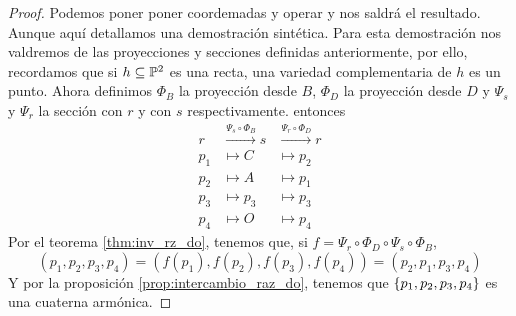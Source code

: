 \begin{thm}
\begin{center}
    \end{center}
\end{thm}

\begin{proof}
 Podemos poner poner coordemadas y operar y nos saldrá el resultado. Aunque aquí detallamos una demostración
 sintética. Para esta demostración nos valdremos de las proyecciones y secciones definidas anteriormente, por
 ello, recordamos que si $h \subseteq \mathbb{P}^2$ es una recta, una variedad complementaria de $h$ es un punto. Ahora
 definimos $\Phi_B$ la proyección desde $B$, $\Phi_D$ la proyección desde $D$ y $\Psi_s$ y $\Psi_r$ la sección
 con $r$ y con $s$ respectivamente. entonces
 \[
  \begin{array}{ccc}
   r & \stackrel{\Psi_s \circ \Phi_B}{\to} s & \stackrel{\Psi_r \circ \Phi_D}{\to} r \\
   p_1 &\mapsto C &\mapsto p_2 \\
   p_2 &\mapsto A &\mapsto p_1 \\
   p_3 &\mapsto p_3 &\mapsto p_3 \\
   p_4 &\mapsto O &\mapsto p_4
  \end{array}
 \]
 Por el teorema \ref{thm:inv_rz_do}, tenemos que, si $f = \Psi_r \circ \Phi_D \circ \Psi_s \circ \Phi_B$,
 \[
  (p_1,p_2,p_3,p_4) = \left( f(p_1), f(p_2), f(p_3), f(p_4) \right) = (p_2,p_1,p_3,p_4)
 \]
 Y por la proposición \ref{prop:intercambio_raz_do}, tenemos que $\left\{p_1,p_2,p_3,p_4\right\}$ es una cuaterna
 armónica.
\end{proof}
